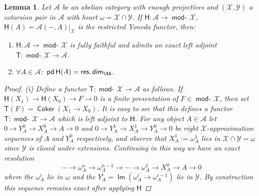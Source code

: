 \documentclass[oneside, a4paper,reqno]{amsart}
\numberwithin{equation}{section}
\newtheorem{lem}[thm]{Lemma}
\theoremstyle{definition}
\begin{document}
\begin{lem} Let ${\mathscr A}$ be an abelian category with enough projectives
 and $({\mathcal X},{\mathcal Y})$ a cotorsion pair in ${\mathscr A}$ with heart $\omega = {\mathcal X} \cap {\mathcal Y}$.
 If $\mathsf{H} : {\mathscr A}  {\longrightarrow} \operatorname*{\mathsf{mod}-\!}{\mathcal X}$, $\mathsf{H}(A) =
{\mathscr A}(-,A)|_{\mathcal X}$ is the restricted Yoneda functor, then:
\begin{enumerate}
\item $\mathsf{H} : {\mathscr A} {\longrightarrow} \operatorname*{\mathsf{mod}-\!}{\mathcal X}$ is fully faithful and admits an exact left
adjoint $\mathsf{T} : \operatorname*{\mathsf{mod}-\!}{\mathcal X} {\longrightarrow} {\mathscr A}$.
\item $\forall A \in
{\mathscr A}$:\, $\operatorname{\mathsf{pd}}\mathsf{H}(A) = \operatorname*{\mathsf{res.dim}}_\XA$.
\end{enumerate}
\begin{proof} (i) Define a functor $\mathsf{T} : \operatorname*{\mathsf{mod}-\!}{\mathcal X} {\longrightarrow} {\mathscr A}$ as
follows. If $\mathsf{H}(X_{1}) {\longrightarrow} \mathsf{H}(X_{0}) {\longrightarrow} F {\longrightarrow} 0$
is a finite presentation of $F \in \operatorname*{\mathsf{mod}-\!}{\mathcal X}$, then set $\mathsf{T}(F)
= \operatorname*{\mathsf{Coker}}(X_{1} \to X_{0})$. It is easy to see that this defines a
functor $\mathsf{T} : \operatorname*{\mathsf{mod}-\!}{\mathcal X} {\longrightarrow} {\mathscr A}$ which is left adjoint to
$\mathsf{H}$. For any  object $A\in {\mathscr A}$ let $0 {\longrightarrow} Y^{0}_{A} {\longrightarrow}
X^{0}_{A} {\longrightarrow} A {\longrightarrow} 0$ and $0 {\longrightarrow} Y^{1}_{A} {\longrightarrow} X^{1}_{A} {\longrightarrow}
Y^{0}_{A} {\longrightarrow} 0$ be right
 ${\mathcal X}$-approximation sequences of
 $A$ and $Y^{0}_{A}$ respectively, and observe that
 $X^{1}_{A} := \omega^{1}_{A}$ lies in ${\mathcal X} \cap {\mathcal Y} = \omega$ since ${\mathcal Y}$ is closed under extensions.
  Continuing in this way we have an exact resolution
\begin{equation}
\cdots {\longrightarrow} \omega^{n}_{A} {\longrightarrow} \omega^{n-1}_{A} {\longrightarrow} \cdots {\longrightarrow}
\omega^{1}_{A} {\longrightarrow} X^{0}_{A} {\longrightarrow} A {\longrightarrow} 0
\end{equation}
where the $\omega^{i}_{A}$ lie in $\omega$ and the $Y^{i}_{A} =
\operatorname*{\mathsf{Im}}(\omega^{i}_{A} \to \omega^{i-1}_{A})$ lie in ${\mathcal Y}$. By
construction this sequence remains exact after applying $\mathsf{H}$

\end{proof}
\end{lem}
\end{document}
